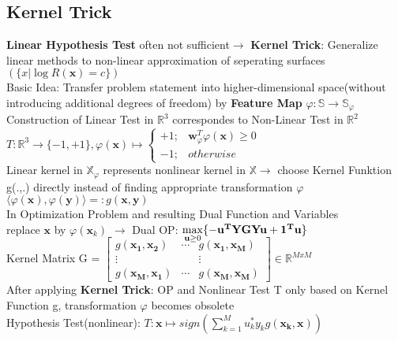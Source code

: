 \begin{sectionbox}
	\subsection{Kernel Trick}
	\textbf{Linear Hypothesis Test} often not sufficient$\rightarrow$ \textbf{Kernel Trick}: Generalize linear methods to non-linear approximation of seperating surfaces $(\{x|\log R(\mathbf{x})=c\})$ \\
	Basic Idea: Transfer problem statement into higher-dimensional space(without introducing additional degrees of freedom) by \textbf{Feature Map} $\varphi: \mathbb{S}\rightarrow\mathbb{S}_{\varphi}$
	\\ 
 Construction of Linear Test in $\mathbb{R}^3$ correspondes to Non-Linear Test in $\mathbb{R}^2$\\
 $\boxed{T:\mathbb{R}^3\rightarrow\{-1,+1\},\varphi(\mathbf{x})\mapsto \begin{cases} +1 ;&\mathbf{w}_{\varphi}^T\varphi(\mathbf{x})\geq0\\
 -1;&otherwise \end{cases}}$ \\
	Linear kernel in $\mathbb{X}_\varphi$ represents nonlinear kernel in $\mathbb{X} \rightarrow$ choose Kernel Funktion g(.,.) directly instead of finding appropriate transformation $\varphi$  \\
	$\boxed{\langle\varphi(\mathbf{x}),\varphi(\mathbf{y})\rangle=:g(\mathbf{x,y})}$ \\

	In Optimization Problem and resulting Dual Function and Variables \\replace $\mathbf{x}$ by $\varphi(\mathbf{x}_k)$ $\rightarrow$ Dual OP: $\smash{\displaystyle\max_{\mathbf{u}\geq0}}\{-\mathbf{u^TYGYu +1^Tu}\}\\$ \\
	Kernel Matrix G = $\begin{bmatrix}
		g(\mathbf{x_1,x_2}) &\cdots& g(\mathbf{x_1,x_M}) \\
		\vdots&&\vdots \\
		g(\mathbf{x_M,x_1}) &\cdots& g(\mathbf{x_M,x_M}) 
	\end{bmatrix} \in \mathbb{R}^{MxM}$ \\
	After applying \textbf{Kernel Trick}: OP and Nonlinear Test T only based on Kernel Function g, transformation $\varphi$ becomes obsolete\\
	Hypothesis Test(nonlinear): $\boxed{T:\mathbf{x}\mapsto sign(\sum_{k=1}^{M}u_k^*y_kg(\mathbf{x_k,x}))}$\\

\end{sectionbox}
